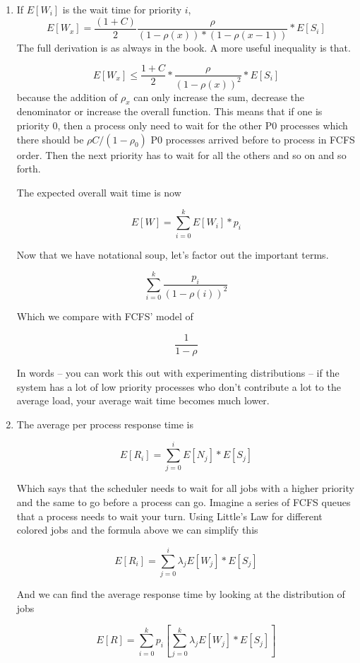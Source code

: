 \begin{enumerate}
\item If $E[W_i]$ is the wait time for priority $i$,
  \[
  E[W_x] = \frac{(1 + C)}{2}\frac{\rho}{(1 - \rho(x))*( 1 - \rho(x-1))} * E[S_i]
  \]
    The full derivation is as always in the book.
    A more useful inequality is that.

    \[
    E[W_x] \leq \frac{1 + C}{2}* \frac{\rho}{(1 - \rho(x))^2} * E[S_i]
    \]
    because the addition of $\rho_x$ can only increase the sum, decrease the denominator or increase the overall function.
  This means that if one is priority 0, then a process only need to wait for the other P0 processes which there should be $\rho C/ (1 - \rho_0)$ P0 processes arrived before to process in FCFS order.
  Then the next priority has to wait for all the others and so on and so forth.

  The expected overall wait time is now

  \[
      E[W] = \sum\limits_{i=0}^k E[W_i] * p_i
  \]

  Now that we have notational soup, let's factor out the important terms.

  \[
      \sum\limits_{i=0}^k \frac{p_i}{(1-\rho(i))^2}
  \]

  Which we compare with FCFS' model of

  \[
      \frac{1}{1-\rho}
  \]

  In words -- you can work this out with experimenting distributions -- if the system has a lot of low priority processes who don't contribute a lot to the average load, your average wait time becomes much lower.

\item The average per process response time is

  \[
  E[R_i] = \sum\limits_{j = 0}^i E[N_j] * E[S_j]
  \]

  Which says that the scheduler needs to wait for all jobs with a higher priority and the same to go before a process can go.
  Imagine a series of FCFS queues that a process needs to wait your turn.
  Using Little's Law for different colored jobs and the formula above we can simplify this

  \[
      E[R_i] = \sum\limits_{j=0}^i \lambda_j E[W_j] * E[S_j]
  \]

  And we can find the average response time by looking at the distribution of jobs

  \[
      E[R] = \sum\limits_{i=0}^k p_i [\sum\limits_{j=0}^k \lambda_j E[W_j] * E[S_j] ]
  \]


\end{enumerate}
